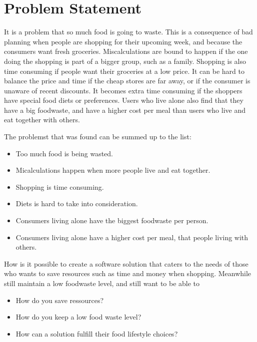 \chapter{Problem Statement}
It is a problem that so much food is going to waste.
This is a consequence of bad planning when people are shopping for their upcoming week, and because the consumers want fresh groceries.
Miscalculations are bound to happen if the one doing the shopping is part of a bigger group, such as a family.
Shopping is also time consuming if people want their groceries at a low price.
It can be hard to balance the price and time if the cheap stores are far away, or if the consumer is unaware of recent discounts.
It becomes extra time consuming if the shoppers have special food diets or preferences.
Users who live alone also find that they have a big foodwaste, and have a higher cost per meal than users who live and eat together with others.

The problemst that was found can be summed up to the list:

\begin{itemize}
    \item Too much food is being wasted.
    \item Micalculations happen when more people live and eat together.
    \item Shopping is time consuming.
    \item Diets is hard to take into consideration.
    \item Consumers living alone have the biggest foodwaste per person.
    \item Consumers living alone have a higher cost per meal, that people living with others.
\end{itemize}

How is it possible to create a software solution that caters to the needs of those who wants to save resources such as time and money when shopping. Meanwhile still maintain a low foodwaste level, and still want to be able to %

\begin{itemize}
	\item How do you save ressources?
	\item How do you keep a low food waste level?
	\item How can a solution fulfill their food lifestyle choices?
\end{itemize}



